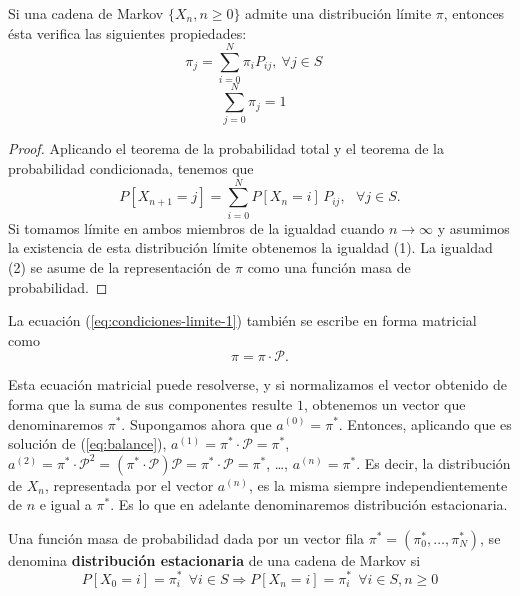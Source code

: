 \begin{proposicion}
    \label{prop:condiciones-limite}
    Si una cadena de Markov $\{X_n,n\geq 0\}$ admite una distribución límite $\pi$, entonces ésta verifica las siguientes propiedades:
    \begin{equation}
        \label{eq:condiciones-limite-1}
        \pi_j = \sum_{i=0}^N \pi_i P_{ij},\ \forall j\in S \ \ \ \ 
    \end{equation}
    \begin{equation}
        \label{eq:condiciones-limite-2}
        \sum_{j=0}^N \pi_j =1 \ \ \ \ 
    \end{equation}
    
\end{proposicion}
\begin{proof}
    Aplicando el teorema de la probabilidad total y el teorema de la probabilidad condicionada, tenemos que
    \begin{equation}
        \label{eq:prob-total-cond}
        P[X_{n+1}=j]=\sum_{i=0}^N P[X_n=i]\,P_{ij}, \ \ \ \forall j\in S.
    \end{equation}
    Si tomamos límite en ambos miembros de la igualdad cuando $n\rightarrow\infty$ y asumimos la existencia de esta distribución límite obtenemos la igualdad (1). La igualdad (2) se asume de la representación de $\pi$ como una función masa de probabilidad.
\end{proof}

La ecuación (\ref{eq:condiciones-limite-1}) también se escribe en forma matricial como 
\begin{equation}
    \label{eq:balance}
    \pi =\pi\cdot \mathcal P.
\end{equation} 

Esta ecuación matricial puede resolverse, y si normalizamos el vector obtenido de forma que la suma de sus componentes resulte $1$, obtenemos un vector que denominaremos $\pi^*$. Supongamos ahora que $a^{(0)} = \pi^*$. Entonces, aplicando que es solución de (\ref{eq:balance}), $a^{(1)} = \pi^*\cdot \mathcal P  = \pi^*$, $a^{(2)} = \pi^*\cdot \mathcal P^2 = (\pi^* \cdot \mathcal P) \mathcal P =\pi^* \cdot \mathcal P =\pi^*$, \dots, $a^{(n)}=\pi^*$. Es decir, la distribución de $X_n$, representada por el vector $a^{(n)}$, es la misma siempre independientemente de $n$ e igual a $\pi^*$. Es lo que en adelante denominaremos distribución estacionaria.

\begin{definicion}
    \label{def:estacionaria}
    Una función masa de probabilidad dada por un vector fila $\pi^* =(\pi_0^*,\dots,\pi_N^*)$, se denomina \textbf{distribución estacionaria} de una cadena de Markov si
    \begin{equation}
        P[X_0=i]=\pi_i^* \ \ \forall i\in S \Rightarrow P[X_n=i]=\pi_i^*\ \ \forall i\in S, n\geq 0
    \end{equation}
    
\end{definicion}


